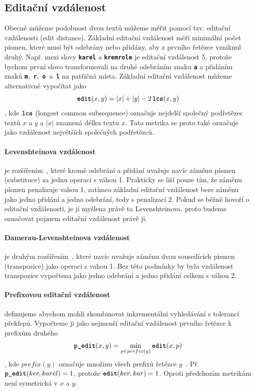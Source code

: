 \documentclass[11pt,letterpaper,oneside,openright]{book}
\newcommand{\bftt}[1]{\texttt{\textbf{#1}}}
\begin{document}
\subsection{Editační vzdálenost}
Obecně můžeme podobnost dvou textů můžeme měřit pomocí tzv. editační
vzdálenosti (edit distance). Základní editační vzdálenost měří minimální počet
písmen, které musí být odebrány nebo přidány, aby z prvního řetězce vzniknul
druhý. Např. mezi slovy \bftt{karel} a \bftt{kremrole} je editační vzdálenost
5, protože bychom první slovo transformovali na druhé odebráním znaku \bftt{a}
a přidáním znaků \bftt{m},~\bftt{r},~\bftt{o}~a~\bftt{l} na patřičná místa.
Základní editační vzdálenost můžeme alternativně vypočítat jako \[\bftt{edit}(x,
y) = |x| + |y| - 2\,\bftt{lcs}(x, y)\], kde $\bftt{lcs}$ (longest common
subsequence) označuje nejdelší společný podřetězec textů $x$ a $y$ a $|x|$
znamená délku textu $x$.  Tato metrika se proto také označuje jako vzdálenost
největších společných podřetězců.

\paragraph{Levenshteinova vzdálenost} je rozšířením~\cite{Levenshtein66}, které
kromě odebrání a přidání uvažuje navíc záměnu písmen (substituce) za jednu
operaci s váhou 1.  Prakticky se liší pouze tím, že záměnu písmen penalizuje
vahou 1, zatímco základní editační vzdálenost bere záměnu jako jedno přidání a
jedno odebrání, tedy s penalizací 2. Pokud se běžně hovoří o editační
vzdálenosti, je jí myšlena právě ta Levenshteinova, proto budeme označovat
pojmem editační vzdálenost právě ji.

\paragraph{Damerau-Levenshteinova vzdálenost} je druhým
rozšířením~\cite{Damerau:1964:TCD:363958.363994}, které navíc uvažuje záměnu
dvou sousedících písmen (transpozice) jako operaci s vahou 1.  Bez této
podmínky by byla vzdálenost transpozice vypočtena jako jedno odebrání a jedno
přidání celkem s váhou 2.

\paragraph{Prefixovou editační vzdálenost} definujeme abychom mohli zkombinovat
inkrementální vyhledávání s tolerancí překlepů. Vypočteme ji jako nejmenší
editační vzdálenost prvního řetězce k prefixům druhého \[\bftt{p\_edit}(x, y) =
\min_{p \in prefix(y)} \bftt{edit}(x, p)\], kde $prefix(y)$ označuje množinu
všech prefixů řetězce $y$~\cite{Bast:2013:EFS:2457465.2457470}. Př.
$\bftt{p\_edit}(ker, karel) = 1$, protože $\bftt{edit}(ker, kar) = 1$. Oproti
předchozím metrikám není symetrická v $x$ a $y$.
\end{document}
